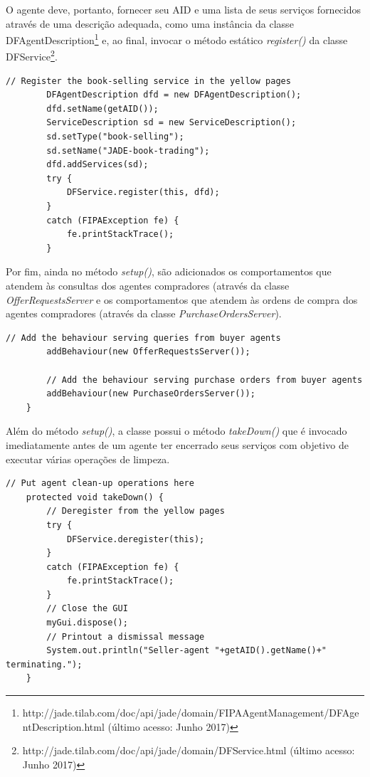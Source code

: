 O agente deve, portanto, fornecer seu AID e uma lista de seus serviços fornecidos através de uma descrição adequada, como uma instância da classe DFAgentDescription\footnote{http://jade.tilab.com/doc/api/jade/domain/FIPAAgentManagement/DFAgentDescription.html (último acesso: Junho 2017)} e, ao final, invocar o método estático \textit{register()} da classe DFService\footnote{http://jade.tilab.com/doc/api/jade/domain/DFService.html (último acesso: Junho 2017)}. 

\begin{lstlisting}[firstnumber=52]
		// Register the book-selling service in the yellow pages
		DFAgentDescription dfd = new DFAgentDescription();
		dfd.setName(getAID());
		ServiceDescription sd = new ServiceDescription();
		sd.setType("book-selling");
		sd.setName("JADE-book-trading");
		dfd.addServices(sd);
		try {
			DFService.register(this, dfd);
		}
		catch (FIPAException fe) {
			fe.printStackTrace();
		}
\end{lstlisting}

Por fim, ainda no método \textit{setup()}, são adicionados os comportamentos que atendem às consultas dos agentes compradores (através da classe \textit{OfferRequestsServer} e os comportamentos que atendem às ordens de compra dos agentes compradores (através da classe \textit{PurchaseOrdersServer}).

\begin{lstlisting}[firstnumber=66]
		// Add the behaviour serving queries from buyer agents
		addBehaviour(new OfferRequestsServer());

		// Add the behaviour serving purchase orders from buyer agents
		addBehaviour(new PurchaseOrdersServer());
	}
\end{lstlisting}

Além do método \textit{setup()}, a classe possui o método \textit{takeDown()} que é invocado imediatamente antes de um agente ter encerrado seus serviços com objetivo de executar várias operações de limpeza.

\begin{lstlisting}[firstnumber=73]
	// Put agent clean-up operations here
	protected void takeDown() {
		// Deregister from the yellow pages
		try {
			DFService.deregister(this);
		}
		catch (FIPAException fe) {
			fe.printStackTrace();
		}
		// Close the GUI
		myGui.dispose();
		// Printout a dismissal message
		System.out.println("Seller-agent "+getAID().getName()+" terminating.");
	}
\end{lstlisting}

